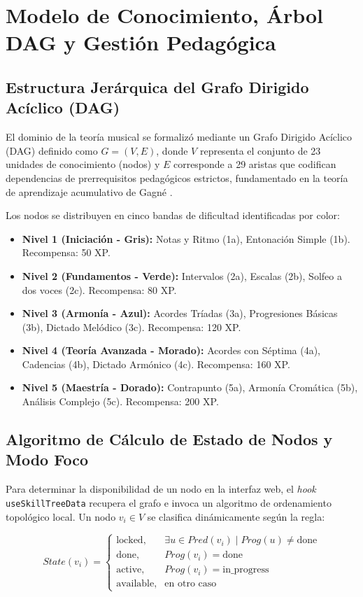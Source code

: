 \section{Modelo de Conocimiento, Árbol DAG y Gestión Pedagógica}

\subsection{Estructura Jerárquica del Grafo Dirigido Acíclico (DAG)}
El dominio de la teoría musical se formalizó mediante un Grafo Dirigido Acíclico (DAG) definido como $G = (V, E)$, donde $V$ representa el conjunto de 23 unidades de conocimiento (nodos) y $E$ corresponde a 29 aristas que codifican dependencias de prerrequisitos pedagógicos estrictos, fundamentado en la teoría de aprendizaje acumulativo de Gagné \cite{gagne_conditions_1985}. 

Los nodos se distribuyen en cinco bandas de dificultad identificadas por color:
\begin{itemize}
    \item \textbf{Nivel 1 (Iniciación - Gris):} Notas y Ritmo (1a), Entonación Simple (1b). Recompensa: 50 XP.
    \item \textbf{Nivel 2 (Fundamentos - Verde):} Intervalos (2a), Escalas (2b), Solfeo a dos voces (2c). Recompensa: 80 XP.
    \item \textbf{Nivel 3 (Armonía - Azul):} Acordes Tríadas (3a), Progresiones Básicas (3b), Dictado Melódico (3c). Recompensa: 120 XP.
    \item \textbf{Nivel 4 (Teoría Avanzada - Morado):} Acordes con Séptima (4a), Cadencias (4b), Dictado Armónico (4c). Recompensa: 160 XP.
    \item \textbf{Nivel 5 (Maestría - Dorado):} Contrapunto (5a), Armonía Cromática (5b), Análisis Complejo (5c). Recompensa: 200 XP.
\end{itemize}

\subsection{Algoritmo de Cálculo de Estado de Nodos y Modo Foco}
Para determinar la disponibilidad de un nodo en la interfaz web, el \textit{hook} \texttt{useSkillTreeData} recupera el grafo e invoca un algoritmo de ordenamiento topológico local. Un nodo $v_i \in V$ se clasifica dinámicamente según la regla:

\begin{equation}
State(v_i) = \begin{cases} 
\text{locked}, & \exists u \in Pred(v_i) \mid Prog(u) \neq \text{done} \\
\text{done}, & Prog(v_i) = \text{done} \\
\text{active}, & Prog(v_i) = \text{in\_progress} \\
\text{available}, & \text{en otro caso}
\end{cases}
\label{eq_state}
\end{equation}

